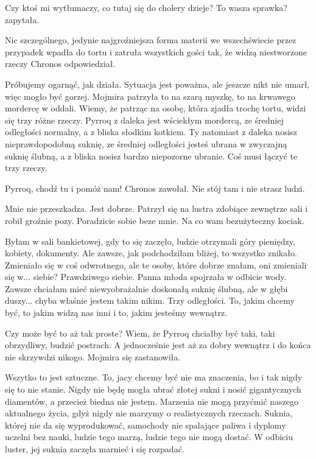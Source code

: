 \ds{} Czy ktoś mi wytłumaczy, co tutaj się do cholery dzieje? To wasza sprawka? \dm{} zapytała. \de{}

\ds{} Nic szczególnego, jedynie najgroźniejsza forma materii we wszechświecie przez przypadek wpadła do tortu i zatruła wszystkich gości tak, że widzą niestworzone rzeczy \dm{}
Chronos odpowiedział.\de{}

\ds{} Próbujemy ogarnąć, jak działa. Sytuacja jest poważna, ale jeszcze nikt nie umarł, więc mogło być gorzej. \dm{} Mojmira patrzyła to na szarą myszkę, to na krwawego mordercę w oddali. \dm{}
Wiemy, że patrząc na osobę, która zjadła trochę tortu, widzi się trzy różne rzeczy. Pyrroq z daleka jest wściekłym mordercą, ze średniej odległości normalny, a z bliska słodkim kotkiem.
Ty natomiast z daleka nosisz nieprawdopodobną suknię, ze średniej odległości jesteś ubrana w zwyczajną suknię ślubną, a z bliska nosisz bardzo niepozorne ubranie.
Coś musi łączyć te trzy rzeczy. \de{}

\ds{} Pyrroq, chodź tu i pomóż nam! \dm{} Chronos zawołał. \dm{} Nie stój tam i nie strasz ludzi. \de{}

\ds{} Mnie nie przeszkadza. Jest dobrze. \dm{} Patrzył się na lustra zdobiące zewnętrze sali i robił groźnie pozy. \dm{}
Poradzicie sobie beze mnie. Na co wam bezużyteczny kociak. \de{}

\ds{} Byłam w sali bankietowej, gdy to się zaczęło, ludzie otrzymali góry pieniędzy, kobiety, dokumenty. Ale zawsze, jak podchodziłam bliżej, to wszystko znikało.
Zmieniało się w coś odwrotnego, ale te osoby, które dobrze znałam, oni zmieniali się w... siebie? Prawdziwego siebie. \dm{} Panna młoda spojrzała w odbicie wody.
\dm{} Zawsze chciałam mieć niewyobrażalnie doskonałą suknię ślubną, ale w głębi duszy... chyba właśnie jestem takim nikim. 
Trzy odległości. To, jakim chcemy być, to jakim widzą nas inni i to, jakim jesteśmy wewnątrz. \de{}

\ds{} Czy może być to aż tak proste? Wiem, że Pyrroq chciałby być taki, taki obrzydliwy, budzić postrach. 
A jednocześnie jest aż za dobry wewnątrz i do końca nie skrzywdzi nikogo. \dm{} Mojmira się zastanowiła. \de{}

\ds{} Wszytko to jest sztuczne. To, jacy chcemy być nie ma znaczenia, bo i tak nigdy się to nie stanie.
Nigdy nie będę mogła ubrać złotej sukni i nosić gigantycznych diamentów, a przecież biedna nie jestem. 
Marzenia nie mogą przyćmić naszego aktualnego życia, gdyż nigdy nie marzymy o realistycznych rzeczach.
Suknia, której nie da się wyprodukować, samochody nie spalające paliwa i dyplomy uczelni bez nauki, ludzie tego marzą, ludzie tego nie mogą dostać. \dm{} 
W odbiciu luster, jej suknia zaczęła marnieć i się rozpadać. \de{}

